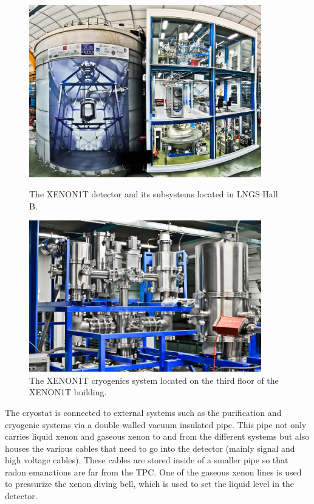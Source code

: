 \begin{figure}[p]
	\centering
	\includegraphics[width=0.90\textwidth]{xe1t_full_detector_assembly}
	\caption{The XENON1T detector and its subsystems located in LNGS Hall B.}
	\label{fig:xe1t_full_detector_assembly}

        \vspace{\floatsep}

	\centering
	\includegraphics[width=0.90\textwidth]{xe1t_cryogenics_system}
	\caption{The XENON1T cryogenics system located on the third floor of the XENON1T building.}
	\label{fig:xe1t_cryogenics_system.png}
\end{figure}

The cryostat is connected to external systems such as the purification and cryogenic systems via a double-walled vacuum insulated pipe.  This pipe not only carries liquid xenon and gaseous xenon to and from the different systems but also houses the various cables that need to go into the detector (mainly signal and high voltage cables).  These cables are stored inside of a smaller pipe so that radon emanations are far from the TPC.  One of the gaseous xenon lines is used to pressurize the xenon diving bell, which is used to set the liquid level in the detector.

